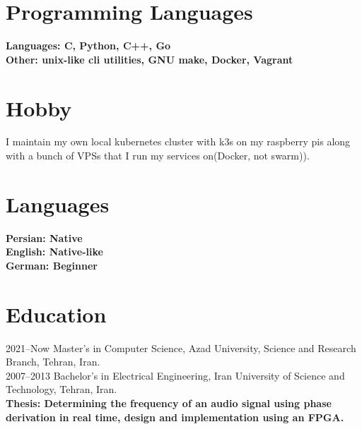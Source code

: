 \documentclass[8pt]{article}
\begin{document}
\begin{multicols}{2}
  \section*{Programming Languages}
  \bf Languages: \normalfont C, Python, C++, Go\\[5pt]
  \bf Other: \normalfont unix-like cli utilities, GNU make, Docker, Vagrant\\[5pt]

  \section*{Hobby}
  I maintain my own local kubernetes cluster with k3s on my raspberry pis along with a bunch of VPSs that I run my services on(Docker, not swarm)).\\[5pt]

  \section*{Languages}
  \bf Persian: {\normalfont Native}\\
  \bf English: {\normalfont Native-like}\\
  \normalfont German: Beginner\\

  \section*{Education}
  2021--Now Master's in Computer Science, Azad University, Science and Research Branch, Tehran, Iran.\\[5pt]
  2007--2013 Bachelor's in Electrical Engineering, Iran University of Science and Technology, Tehran, Iran.\\[5pt]
  \bf Thesis: \normalfont Determining the frequency of an audio signal using phase derivation in real time, design and implementation using an FPGA.


\end{multicols}
\end{document}
